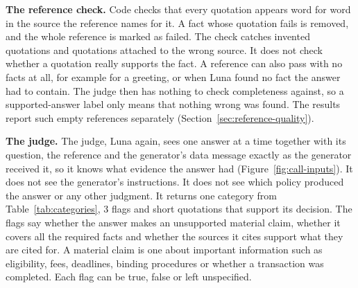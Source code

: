 \textbf{The reference check.} Code checks that every quotation appears word for word in the source the reference names for it. A fact whose quotation fails is removed, and the whole reference is marked as failed. The check catches invented quotations and quotations attached to the wrong source. It does not check whether a quotation really supports the fact. A reference can also pass with no facts at all, for example for a greeting, or when Luna found no fact the answer had to contain. The judge then has nothing to check completeness against, so a supported-answer label only means that nothing wrong was found. The results report such empty references separately (Section~\ref{sec:reference-quality}).

\textbf{The judge.} The judge, Luna again, sees one answer at a time together with its question, the reference and the generator's data message exactly as the generator received it, so it knows what evidence the answer had (Figure~\ref{fig:call-inputs}). It does not see the generator's instructions. It does not see which policy produced the answer or any other judgment. It returns one category from Table~\ref{tab:categories}, 3 flags and short quotations that support its decision. The flags say whether the answer makes an unsupported material claim, whether it covers all the required facts and whether the sources it cites support what they are cited for. A material claim is one about important information such as eligibility, fees, deadlines, binding procedures or whether a transaction was completed. Each flag can be true, false or left unspecified.

